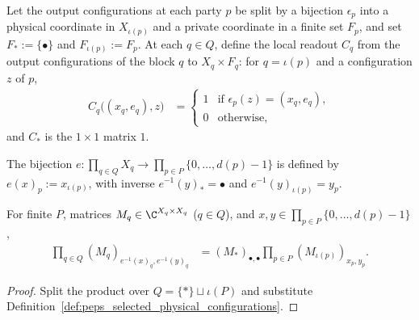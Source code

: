 \begin{definition}
    \label{def:peps_selected_physical_private_basis}
    \leanok
    Let the output configurations at each party $p$ be split by a bijection $\epsilon_p$ into a physical coordinate in $X_{\iota(p)}$ and a private coordinate in a finite set $F_p$, and set $F_*:=\{\bullet\}$ and $F_{\iota(p)}:=F_p$. At each $q\in Q$, define the local readout $C_q$ from the output configurations of the block $q$ to $X_q\times F_q$: for $q=\iota(p)$ and a configuration $z$ of $p$,
    \begin{align}
        C_q\bigl((x_q,e_q),z\bigr)
         & =\begin{cases}
                1 & \text{if }\epsilon_p(z)=(x_q,e_q), \\
                0 & \text{otherwise},
            \end{cases}
        \label{eq:peps_selected_physical_private_column}
    \end{align}
    and $C_*$ is the $1\times1$ matrix $1$.
\end{definition}



\begin{definition}
    \label{def:peps_selected_physical_configurations}
    \leanok
    The bijection $e:\prod_{q\in Q}X_q\to\prod_{p\in P}\{0,\ldots,d(p)-1\}$ is defined by $e(x)_p:=x_{\iota(p)}$, with inverse $e^{-1}(y)_*=\bullet$ and $e^{-1}(y)_{\iota(p)}=y_p$.
\end{definition}



\begin{lemma}
    \label{thm:peps_selected_physical_product_scalar}
    \leanok
    For finite $P$, matrices $M_q\in\C^{X_q\times X_q}$ ($q\in Q$), and $x,y\in\prod_{p\in P}\{0,\ldots,d(p)-1\}$,
    \begin{align}
        \prod_{q\in Q}
        (M_q)_{e^{-1}(x)_q,e^{-1}(y)_q}
         & =(M_*)_{\bullet,\bullet}
        \prod_{p\in P}(M_{\iota(p)})_{x_p,y_p}.
        \label{eq:peps_selected_physical_product_scalar}
    \end{align}
\end{lemma}

\begin{proof}
    \leanok
    Split the product over $Q=\{*\}\sqcup\iota(P)$ and substitute Definition~\ref{def:peps_selected_physical_configurations}.
\end{proof}
